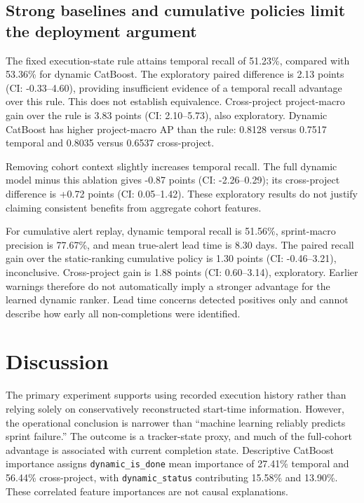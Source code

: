 \documentclass[11pt,a4paper]{article}
\begin{document}
\subsection{Strong baselines and cumulative policies limit the deployment argument}\label{strong-baselines-and-cumulative-policies-limit-the-deployment-argument}

The fixed execution-state rule attains temporal recall of 51.23\%, compared with 53.36\% for dynamic CatBoost. The exploratory paired difference is 2.13 points (CI: -0.33--4.60), providing insufficient evidence of a temporal recall advantage over this rule. This does not establish equivalence. Cross-project project-macro gain over the rule is 3.83 points (CI: 2.10--5.73), also exploratory. Dynamic CatBoost has higher project-macro AP than the rule: 0.8128 versus 0.7517 temporal and 0.8035 versus 0.6537 cross-project.

Removing cohort context slightly increases temporal recall. The full dynamic model minus this ablation gives -0.87 points (CI: -2.26--0.29); its cross-project difference is +0.72 points (CI: 0.05--1.42). These exploratory results do not justify claiming consistent benefits from aggregate cohort features.

For cumulative alert replay, dynamic temporal recall is 51.56\%, sprint-macro precision is 77.67\%, and mean true-alert lead time is 8.30 days. The paired recall gain over the static-ranking cumulative policy is 1.30 points (CI: -0.46--3.21), inconclusive. Cross-project gain is 1.88 points (CI: 0.60--3.14), exploratory. Earlier warnings therefore do not automatically imply a stronger advantage for the learned dynamic ranker. Lead time concerns detected positives only and cannot describe how early all non-completions were identified.

\section{Discussion}\label{discussion}

The primary experiment supports using recorded execution history rather than relying solely on conservatively reconstructed start-time information. However, the operational conclusion is narrower than ``machine learning reliably predicts sprint failure.'' The outcome is a tracker-state proxy, and much of the full-cohort advantage is associated with current completion state. Descriptive CatBoost importance assigns \texttt{dynamic\_\allowbreak{}is\_\allowbreak{}done} mean importance of 27.41\% temporal and 56.44\% cross-project, with \texttt{dynamic\_\allowbreak{}status} contributing 15.58\% and 13.90\%. These correlated feature importances are not causal explanations.
\end{document}
